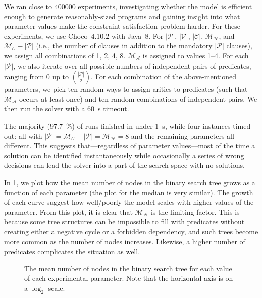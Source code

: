 \documentclass[runningheads]{llncs}
\newcommand{\predicates}{\mathcal{P}}
\newcommand{\variables}{\mathcal{V}}
\newcommand{\constants}{\mathcal{C}}
\newcommand{\maxArity}{\mathcal{M}_{\mathcal{A}}}
\newcommand{\maxNumNodes}{\mathcal{M}_{\mathcal{N}}}
\newcommand{\maxNumClauses}{\mathcal{M}_{\mathcal{C}}}
\begin{document}
We ran close to \num{400000} experiments, investigating whether the model is
efficient enough to generate reasonably-sized programs and gaining insight into
what parameter values make the constraint satisfaction problem harder. For these
experiments, we use Choco~4.10.2 \cite{choco} with Java~8. For
$|\predicates{}|$, $|\variables{}|$, $|\constants{}|$, $\maxNumNodes{}$, and
$\maxNumClauses{} - |\predicates{}|$ (i.e., the number of clauses in addition to
the mandatory $|\predicates{}|$ clauses), we assign all combinations of 1, 2, 4,
8. $\maxArity{}$ is assigned to values 1--4. For each $|\predicates{}|$, we also
iterate over all possible numbers of independent pairs of predicates, ranging
from 0 up to $\binom{|\predicates{}|}{2}$. For each combination of the
above-mentioned parameters, we pick ten random ways to assign arities to
predicates (such that $\maxArity{}$ occurs at least once) and ten random
combinations of independent pairs. We then run the solver with a
\SI{60}{\second} timeout.

The majority (\SI{97.7}{\percent}) of runs finished in under \SI{1}{\second},
while four instances timed out: all with $|\predicates{}| = \maxNumClauses{} -
|\predicates{}| = \maxNumNodes{} = 8$ and the remaining parameters all
different. This suggests that---regardless of parameter values---most of the
time a solution can be identified instantaneously while occasionally a series of
wrong decisions can lead the solver into a part of the search space with no
solutions.

In \cref{fig:impact}, we plot how the mean number of nodes in the binary search
tree grows as a function of each parameter (the plot for the median is very
similar). The growth of each curve suggest how well/poorly the model scales with
higher values of the parameter. From this plot, it is clear that
$\maxNumNodes{}$ is the limiting factor. This is because some tree structures
can be impossible to fill with predicates without creating either a negative
cycle or a forbidden dependency, and such trees become more common as the number
of nodes increases. Likewise, a higher number of predicates complicates the
situation as well.

\begin{figure}[t]
  \centering
  
  \caption{The mean number of nodes in the binary search tree for each value of
    each experimental parameter. Note that the horizontal axis is on a $\log_2$
    scale.}
  \label{fig:impact}
\end{figure}
\end{document}
